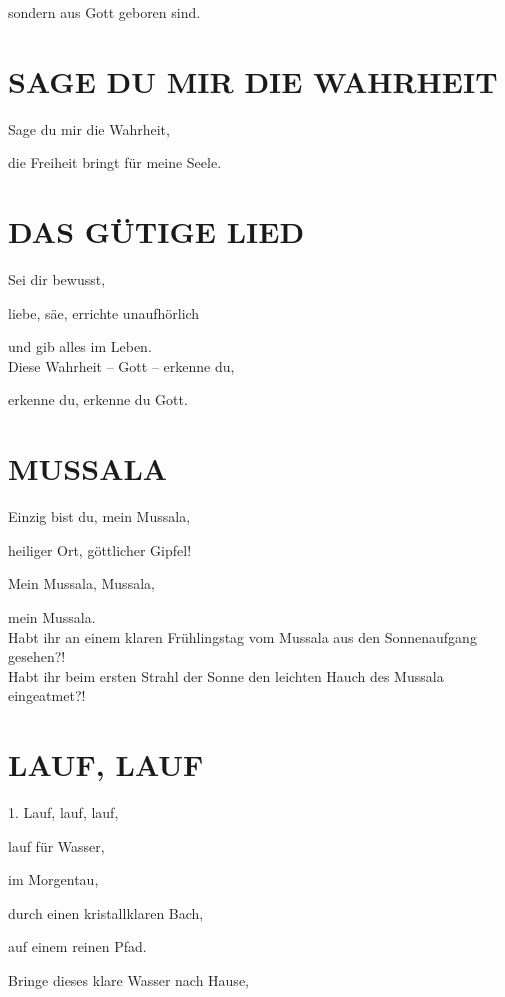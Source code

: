 \documentclass[11pt,a5paper,twoside]{article}
\begin{document}
sondern aus Gott geboren sind. 

\section[Sage du mir die Wahrheit]{SAGE DU MIR DIE WAHRHEIT}

Sage du mir die Wahrheit,

die Freiheit bringt für meine Seele. 

\section[Das gütige Lied]{DAS GÜTIGE LIED}

Sei dir bewusst, 

liebe, säe, errichte unaufhörlich

und gib alles im Leben.\\


Diese Wahrheit -- Gott -- erkenne du,

erkenne du, erkenne du Gott.

\section[Mussala]{MUSSALA}

Einzig bist du, mein Mussala,

heiliger Ort, göttlicher Gipfel!

Mein Mussala, Mussala,

mein Mussala.\\

Habt ihr an einem klaren Frühlingstag vom Mussala aus den Sonnenaufgang gesehen?!\\

Habt ihr beim ersten Strahl der Sonne den leichten Hauch des Mussala eingeatmet?!\\

\section[Lauf, lauf]{LAUF, LAUF}

1. Lauf, lauf, lauf, 

lauf für Wasser,

im Morgentau, 

durch einen kristallklaren Bach,

auf einem reinen Pfad. 

Bringe dieses klare Wasser nach Hause, 
\end{document}
